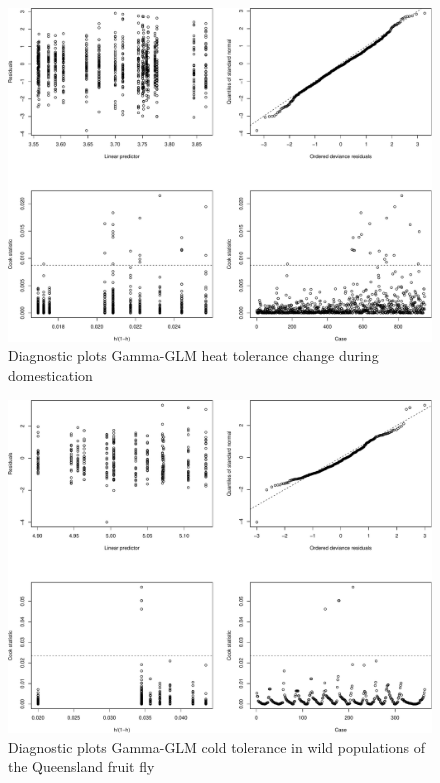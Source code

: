 \documentclass[]{article}
\begin{document}
\begin{figure}

{\centering \includegraphics{Supplementary_files/figure-latex/Diagnostic plots heat tolerance during domestication-1} 

}

\caption{Diagnostic plots Gamma-GLM heat tolerance change during domestication}\label{fig:Diagnostic plots heat tolerance during domestication}
\end{figure}

\begin{figure}

{\centering \includegraphics{Supplementary_files/figure-latex/Diagnostic plots cold tolerance wild flies-1} 

}

\caption{Diagnostic plots Gamma-GLM cold tolerance in wild populations of the Queensland fruit fly}\label{fig:Diagnostic plots cold tolerance wild flies}
\end{figure}
\end{document}
